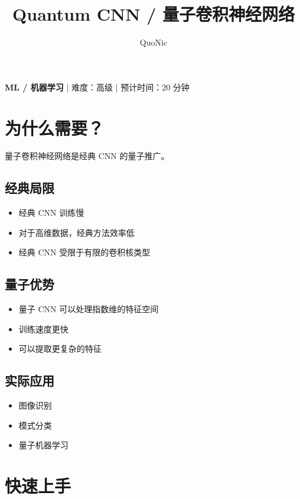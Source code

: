 \documentclass[12pt,a4paper]{article}
\title{Quantum CNN / 量子卷积神经网络}
\author{QuoNic}
\date{}
\begin{document}
\maketitle

\begin{center}
\textbf{ML / 机器学习} | 难度：高级 | 预计时间：20 分钟
\end{center}

\tableofcontents
\newpage

\section{为什么需要？}

量子卷积神经网络是经典 CNN 的量子推广。

\subsection{经典局限}
\begin{itemize}
  \item 经典 CNN 训练慢
  \item 对于高维数据，经典方法效率低
  \item 经典 CNN 受限于有限的卷积核类型
\end{itemize}

\subsection{量子优势}
\begin{itemize}
  \item 量子 CNN 可以处理指数维的特征空间
  \item 训练速度更快
  \item 可以提取更复杂的特征
\end{itemize}

\subsection{实际应用}
\begin{itemize}
  \item 图像识别
  \item 模式分类
  \item 量子机器学习
\end{itemize}

\section{快速上手}
\end{document}
